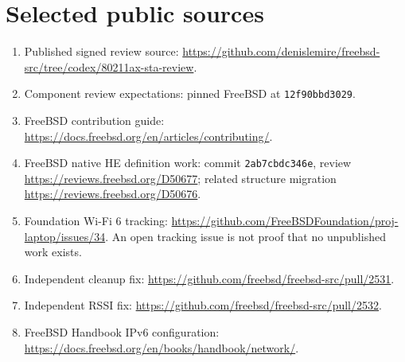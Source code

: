 \documentclass[11pt,letterpaper,oneside]{article}
\newcommand{\code}[1]{\texttt{\small #1}}
\begin{document}
\clearpage
\section{Selected public sources}
\begin{enumerate}
\item Published signed review source: \url{https://github.com/denislemire/freebsd-src/tree/codex/80211ax-sta-review}.
\item Component review expectations: pinned FreeBSD  at \code{12f90bbd3029}.
\item FreeBSD contribution guide: \url{https://docs.freebsd.org/en/articles/contributing/}.
\item FreeBSD native HE definition work: commit \code{2ab7cbdc346e}, review \url{https://reviews.freebsd.org/D50677}; related structure migration \url{https://reviews.freebsd.org/D50676}.
\item Foundation Wi-Fi 6 tracking: \url{https://github.com/FreeBSDFoundation/proj-laptop/issues/34}. An open tracking issue is not proof that no unpublished work exists.
\item Independent cleanup fix: \url{https://github.com/freebsd/freebsd-src/pull/2531}.
\item Independent RSSI fix: \url{https://github.com/freebsd/freebsd-src/pull/2532}.
\item FreeBSD Handbook IPv6 configuration: \url{https://docs.freebsd.org/en/books/handbook/network/}.
\end{enumerate}
\end{document}
